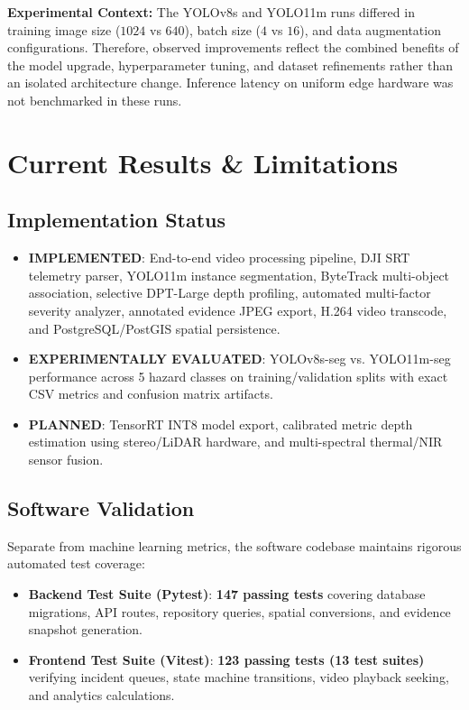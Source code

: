 \documentclass[12pt,a4paper]{article}
\begin{document}
\textbf{Experimental Context:} The YOLOv8s and YOLO11m runs differed in training image size ($1024$ vs $640$), batch size ($4$ vs $16$), and data augmentation configurations. Therefore, observed improvements reflect the combined benefits of the model upgrade, hyperparameter tuning, and dataset refinements rather than an isolated architecture change. Inference latency on uniform edge hardware was not benchmarked in these runs.

\section{Current Results \& Limitations}

\subsection{Implementation Status}
\begin{itemize}[leftmargin=1.5em, itemsep=0.1em]
    \item \textbf{IMPLEMENTED}: End-to-end video processing pipeline, DJI SRT telemetry parser, YOLO11m instance segmentation, ByteTrack multi-object association, selective DPT-Large depth profiling, automated multi-factor severity analyzer, annotated evidence JPEG export, H.264 video transcode, and PostgreSQL/PostGIS spatial persistence.
    \item \textbf{EXPERIMENTALLY EVALUATED}: YOLOv8s-seg vs. YOLO11m-seg performance across 5 hazard classes on training/validation splits with exact CSV metrics and confusion matrix artifacts.
    \item \textbf{PLANNED}: TensorRT INT8 model export, calibrated metric depth estimation using stereo/LiDAR hardware, and multi-spectral thermal/NIR sensor fusion.
\end{itemize}

\subsection{Software Validation}
Separate from machine learning metrics, the software codebase maintains rigorous automated test coverage:
\begin{itemize}[leftmargin=1.5em, itemsep=0.1em]
    \item \textbf{Backend Test Suite (Pytest)}: \textbf{147 passing tests} covering database migrations, API routes, repository queries, spatial conversions, and evidence snapshot generation.
    \item \textbf{Frontend Test Suite (Vitest)}: \textbf{123 passing tests (13 test suites)} verifying incident queues, state machine transitions, video playback seeking, and analytics calculations.
\end{itemize}
\end{document}
